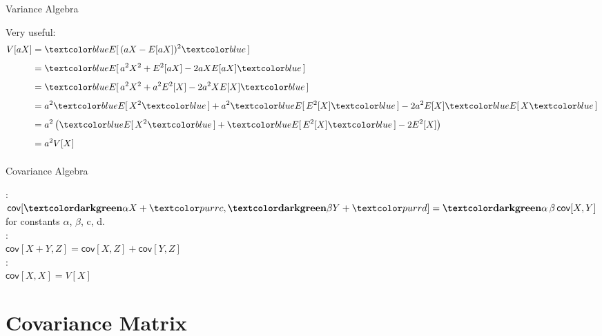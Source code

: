 \documentclass[10pt,sans,english,compress,xcolor=dvipsnames]{beamer}
\begin{document}
\begin{frame}{Variance Algebra}
\small

Very useful: \\[2ex]

\footnotesize
\begin{align*}
V[aX]   & = \bbl{E[\,} (aX -E[aX])^2\bbl{\,]} \hspace{10cm}\\[1ex]	    
            & = \bbl{E[\,} a^2X^2 + E^2[aX] - 2aXE[aX]  \bbl{\,]} \\[1ex]
            & = \bbl{E[\,} a^2X^2 + a^2E^2[X] - 2a^2XE[X]  \bbl{\,]} \\[1ex]
            & = a^2\bbl{E[\,} X^2\bbl{\,]} + a^2\bbl{E[\,} E^2[X]\bbl{\,]} - 2a^2E[X]\bbl{E[\,} X  \bbl{\,]} \\[1ex]
            & = a^2\left( \bbl{E[\,} X^2\bbl{\,]} + \bbl{E[\,} E^2[X]\bbl{\,]} - 2E^2[X]\right) \\[1ex]
            & = a^2 V[X] \\[1ex]            
\end{align*}




\end{frame} 


\begin{frame}{Covariance Algebra}
\small

:\\[1ex]
$\mathsf{cov}[\dgreen{$\alpha$}X + \purp{c}, \dgreen{$\beta$}Y + \purp{d}]= \dgreen{$\alpha\,\beta$}\,\mathsf{cov}[X,Y]$ for constants $\alpha$, $\beta$, c, d. \\[2ex]

:\\[1ex]
$\mathsf{cov}[X+Y, Z] = \mathsf{cov}[X, Z ] + \mathsf{cov}[Y, Z ]$\\[1ex] 

:\\[1ex]
$\mathsf{cov}[X, X]= V[X]$ \\[2ex]

\end{frame} 


\section{Covariance Matrix}
\end{document}
